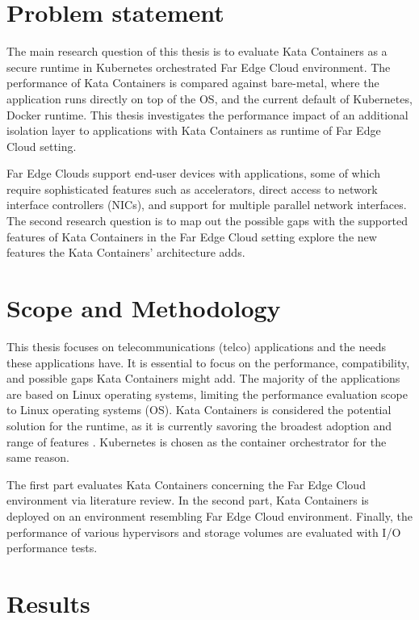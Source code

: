 \section{Problem statement}
\label{section:intro_problemstatement}

The main research question of this thesis is to evaluate Kata Containers as a secure runtime in Kubernetes orchestrated Far Edge Cloud environment. The performance of Kata Containers is compared against bare-metal, where the application runs directly on top of the OS, and the current default of Kubernetes, Docker runtime. This thesis investigates the performance impact of an additional isolation layer to applications with Kata Containers as runtime of Far Edge Cloud setting.

Far Edge Clouds support end-user devices with applications, some of which require sophisticated features such as accelerators, direct access to network interface controllers (NICs), and support for multiple parallel network interfaces. The second research question is to map out the possible gaps with the supported features of Kata Containers in the Far Edge Cloud setting explore the new features the Kata Containers' architecture adds.

\section{Scope and Methodology}
\label{section:intro_scopemethodology}

This thesis focuses on telecommunications (telco) applications and the needs these applications have. It is essential to focus on the performance, compatibility, and possible gaps Kata Containers might add. The majority of the applications are based on Linux operating systems, limiting the performance evaluation scope to Linux operating systems (OS). Kata Containers is considered the potential solution for the runtime, as it is currently savoring the broadest adoption and range of features \cite{Flauzac2020}. Kubernetes is chosen as the container orchestrator for the same reason.

The first part evaluates Kata Containers concerning the Far Edge Cloud environment via literature review. In the second part, Kata Containers is deployed on an environment resembling Far Edge Cloud environment. Finally, the performance of various hypervisors and storage volumes are evaluated with I/O performance tests.

\section{Results}
\label{section:intro_results}

